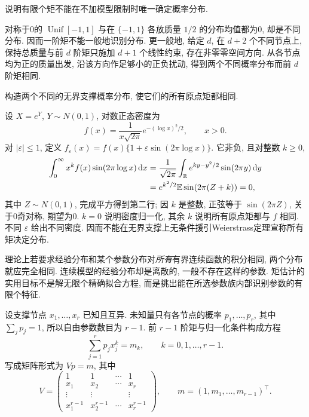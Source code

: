\begin{example}
说明有限个矩不能在不加模型限制时唯一确定概率分布.
\end{example}
\begin{solution}
对称于0的 $\operatorname{Unif}[-1,1]$ 与在 $\{-1,1\}$ 各放质量 $1/2$ 的分布均值都为0, 却是不同分布. 因而一阶矩不能一般地识别分布. 更一般地, 给定 $d$, 在 $d+2$ 个不同节点上, 保持总质量与前 $d$ 阶矩只施加 $d+1$ 个线性约束, 存在非零零空间方向. 从各节点均为正的质量出发, 沿该方向作足够小的正负扰动, 得到两个不同概率分布而前 $d$ 阶矩相同.
\end{solution}

\begin{example}
构造两个不同的无界支撑概率分布, 使它们的所有原点矩都相同.
\end{example}
\begin{solution}
设 $X=e^Y$, $Y\sim N(0,1)$, 对数正态密度为
\[
 f(x)=\frac1{x\sqrt{2\pi}}e^{-(\log x)^2/2},\qquad x>0.
\]
对 $|\varepsilon|\le1$, 定义 $f_\varepsilon(x)=f(x)\{1+\varepsilon\sin(2\pi\log x)\}$. 它非负, 且对整数 $k\ge0$,
\begin{align*}
 \int_0^\infty x^kf(x)\sin(2\pi\log x)\,\mathrm dx
 &=\frac1{\sqrt{2\pi}}\int_{\mathbb R}e^{ky-y^2/2}\sin(2\pi y)\,\mathrm dy\\
 &=e^{k^2/2}\mathbb E\sin(2\pi(Z+k))=0,
\end{align*}
其中 $Z\sim N(0,1)$, 完成平方得到第二行; 因 $k$ 是整数, 正弦等于 $\sin(2\pi Z)$, 关于0奇对称, 期望为0. $k=0$ 说明密度归一化, 其余 $k$ 说明所有原点矩都与 $f$ 相同. 不同 $\varepsilon$ 给出不同密度. 因而不能在无界支撑上无条件援引Weierstrass定理宣称所有矩决定分布.
\end{solution}

理论上若要求经验分布和某个参数分布对\emph{所有}有界连续函数的积分相同, 两个分布就应完全相同. 连续模型的经验分布却是离散的, 一般不存在这样的参数. 矩估计的实用目标不是解无限个精确拟合方程, 而是挑出能在所选参数族内部识别参数的有限个特征.

设支撑节点 $x_1,\ldots,x_r$ 已知且互异. 未知量只有各节点的概率 $p_1,\ldots,p_r$, 其中 $\sum_jp_j=1$, 所以自由参数数目为 $r-1$. 前 $r-1$ 阶矩与归一化条件构成方程
\[
 \sum_{j=1}^rp_jx_j^k=m_k,\qquad k=0,1,\ldots,r-1.
\]
写成矩阵形式为 $Vp=m$, 其中
\[
 V=\begin{pmatrix}
 1&1&\cdots&1\\
 x_1&x_2&\cdots&x_r\\
 \vdots&\vdots&&\vdots\\
 x_1^{r-1}&x_2^{r-1}&\cdots&x_r^{r-1}
 \end{pmatrix},\qquad
 m=(1,m_1,\ldots,m_{r-1})^\top.
\]

